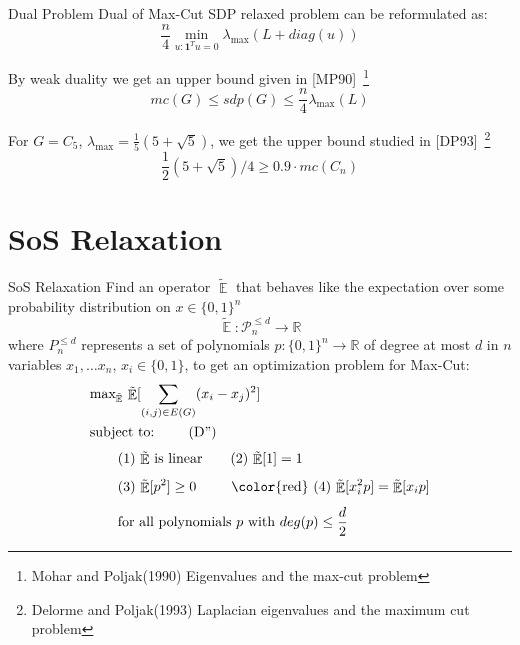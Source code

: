 \documentclass[10pt, xcolor={dvipsnames}]{beamer}
\DeclareMathOperator{\Ex}{\mathbb{E}}
\newcommand{\vect}[1]{\boldsymbol{#1}}
\begin{document}
\begin{frame}{Dual Problem}
Dual of Max-Cut SDP relaxed problem can be reformulated as:
\begin{equation}
\frac{n}{4} \min_{u: \vect{1}^{T} u = 0} \lambda_{\max}(L + diag(u))
\end{equation}

By weak duality we get an upper bound given in [MP90]~\footnote{Mohar and Poljak(1990) Eigenvalues and the max-cut problem}
\begin{equation}
mc(G) \leq sdp(G) \leq \frac{n}{4} \lambda_{\max}(L)
\end{equation}

For $G = C_5$, $\lambda_{\max} = \frac{1}{5}(5 + \sqrt{5})$, we get the upper bound studied in [DP93]~\footnote{Delorme and Poljak(1993) Laplacian eigenvalues
and the maximum cut problem}
\begin{equation}
\frac{1}{2}(5 + \sqrt{5})/4 \geq 0.9 \cdot mc(C_{n})
\end{equation}
\end{frame}

\section{SoS Relaxation}
\begin{frame}{SoS Relaxation}
Find an operator $\tilde{\Ex}$ that behaves like the expectation over some probability distribution on $x \in \lbrace 0, 1 \rbrace^{n}$
\begin{equation}
\tilde{\Ex}: \mathcal{P}^{\leq d}_{n} \rightarrow \mathbb{R}
\end{equation}
where ${P}^{\leq d}_{n}$ represents a set of polynomials $p: \lbrace 0, 1 \rbrace^{n} \rightarrow \mathbb{R}$ of degree at most $d$ in $n$ variables $x_1, \dots x_n$, {\color{red} $x_{i} \in \lbrace 0, 1 \rbrace$}, to get an optimization problem for Max-Cut:
\begin{align}
& \text{max}_{\tilde{\Ex}} \ \tilde{\Ex}[ \sum_{(i, j) \in E(G)} (x_{i} - x_{j})^{2} ] \nonumber\\
& \text{subject to: } \label{eq: P} \tag{D''}\\[.4em]
& \qquad \text{(1) $\tilde{\Ex}$ is linear} \qquad \text{(2) $\tilde{\Ex}[1] = 1$} \nonumber\\[.4em]
& \qquad \text{(3) $\tilde{\Ex}[p^2] \geq 0$} \qquad \, \, \, \text{\color{red} (4) $\tilde{\Ex}[x_{i}^{2}p] = \tilde{\Ex}[x_{i}p]$} \nonumber\\[.4em]
& \qquad \text{for all polynomials $p$ with $deg(p) \leq \frac{d}{2}$}\nonumber
\end{align}
\end{frame}
\end{document}
